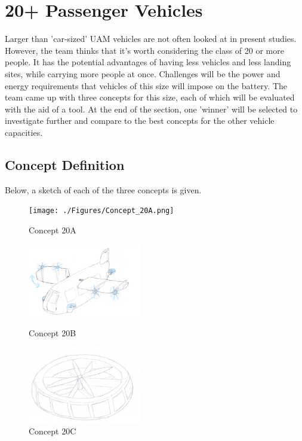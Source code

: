 \section{20+ Passenger Vehicles}
Larger than 'car-sized' UAM vehicles are not often looked at in present studies. However, the team thinks that it's worth considering the class of 20 or more people. It has the potential advantages of having less vehicles and less landing sites, while carrying more people at once. Challenges will be the power and energy requirements that vehicles of this size will impose on the battery. The team came up with three concepts for this size, each of which will be evaluated with the aid of a tool. At the end of the section, one 'winner' will be selected to investigate further and compare to the best concepts for the other vehicle capacities. 

\subsection{Concept Definition}
Below, a sketch of each of the three concepts is given.  

\begin{figure}[H]
  \centering
  \begin{minipage}[b]{0.25\textwidth}
    \texttt{[image: ./Figures/Concept\_20A.png]}
    \captionsetup{justification=centering}
    \caption{Concept 20A}
    \label{concept20a}
  \end{minipage}
  \hspace{1.25cm}
  \begin{minipage}[b]{0.25\textwidth}
    \includegraphics[width=5.0cm]{./Figures/Concept_20B.png}
    \captionsetup{justification=centering}
    \caption{Concept 20B}
    \label{concept20b}
  \end{minipage}
  \hspace{1.25cm}
  \begin{minipage}[b]{0.25\textwidth}
    \includegraphics[width=5.0cm]{./Figures/Concept_20D.png}
    \captionsetup{justification=centering}
    \caption{Concept 20C}
    \label{concept20c}
  \end{minipage}  
\end{figure}

